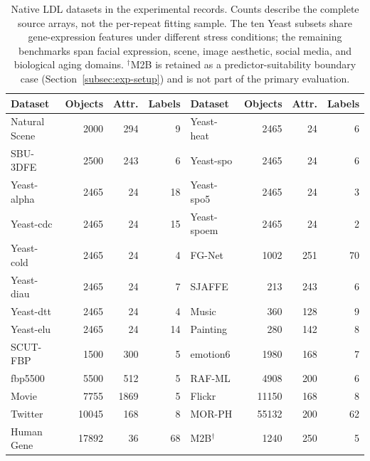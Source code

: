 \begin{table}[htbp]\centering
\caption{Native LDL datasets in the experimental records. Counts describe the complete source arrays, not the per-repeat fitting sample. The ten Yeast subsets share gene-expression features under different stress conditions; the remaining benchmarks span facial expression, scene, image aesthetic, social media, and biological aging domains. $^{\dagger}$M2B is retained as a predictor-suitability boundary case (Section~\ref{subsec:exp-setup}) and is not part of the primary evaluation.}
\label{tab:datasets}
\centering\scriptsize\renewcommand{\arraystretch}{1.15}\setlength{\tabcolsep}{5pt}
\begin{tabular}{lrrr@{\hspace{1.6em}}lrrr}\hline
Dataset & Objects & Attr. & Labels & Dataset & Objects & Attr. & Labels\\\hline
Natural Scene & 2000 & 294 & 9 & Yeast-heat & 2465 & 24 & 6\\
SBU-3DFE & 2500 & 243 & 6 & Yeast-spo & 2465 & 24 & 6\\
Yeast-alpha & 2465 & 24 & 18 & Yeast-spo5 & 2465 & 24 & 3\\
Yeast-cdc & 2465 & 24 & 15 & Yeast-spoem & 2465 & 24 & 2\\
Yeast-cold & 2465 & 24 & 4 & FG-Net & 1002 & 251 & 70\\
Yeast-diau & 2465 & 24 & 7 & SJAFFE & 213 & 243 & 6\\
Yeast-dtt & 2465 & 24 & 4 & Music & 360 & 128 & 9\\
Yeast-elu & 2465 & 24 & 14 & Painting & 280 & 142 & 8\\
SCUT-FBP & 1500 & 300 & 5 & emotion6 & 1980 & 168 & 7\\
fbp5500 & 5500 & 512 & 5 & RAF-ML & 4908 & 200 & 6\\
Movie & 7755 & 1869 & 5 & Flickr & 11150 & 168 & 8\\
Twitter & 10045 & 168 & 8 & MOR-PH & 55132 & 200 & 62\\
Human Gene & 17892 & 36 & 68 & M2B$^{\dagger}$ & 1240 & 250 & 5\\
\hline\end{tabular}
\end{table}
